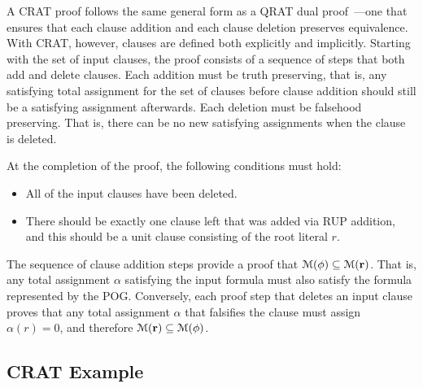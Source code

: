 \documentclass[letterpaper,USenglish,cleveref, autoref, thm-restate]{lipics-v2021}
\newcommand{\assign}{\alpha}
\newcommand{\modelset}{{\cal M}}
\newcommand{\makenode}[1]{\mathbf{#1}}
\newcommand{\noder}{\makenode{r}}
\begin{document}
A CRAT proof follows the same general form as a QRAT dual
proof~\cite{bryant:cade:2021}---one that ensures that each clause
addition and each clause deletion preserves equivalence.  With CRAT,
however, clauses are defined both explicitly and implicitly.  Starting
with the set of input clauses, the proof consists of a sequence of
steps that both add and delete clauses.  Each addition must be truth
preserving, that is, any satisfying total assignment for the set of clauses
before clause addition should still be a satisfying assignment afterwards.
Each deletion must be falsehood preserving.  That is, there can be no
new satisfying assignments when the clause is deleted.

At the completion of the proof, the following conditions must hold:
\begin{itemize}
\item All of the input clauses have been deleted.
\item There should be exactly one clause left that was added via RUP
  addition, and this should be a unit clause consisting of the root literal $r$.
\end{itemize}
The sequence of clause addition steps provide a proof that
$\modelset(\phi) \subseteq \modelset(\noder)$.  That is, any total
assignment $\assign$ satisfying the input formula must also satisfy
the formula represented by the POG\@.
Conversely,
each proof step that deletes an input clause proves that any
total assignment $\alpha$ that falsifies the clause must
assign $\assign(r) = 0$, and therefore 
$\modelset(\noder) \subseteq \modelset(\phi)$.

\subsection{CRAT Example}
\end{document}
